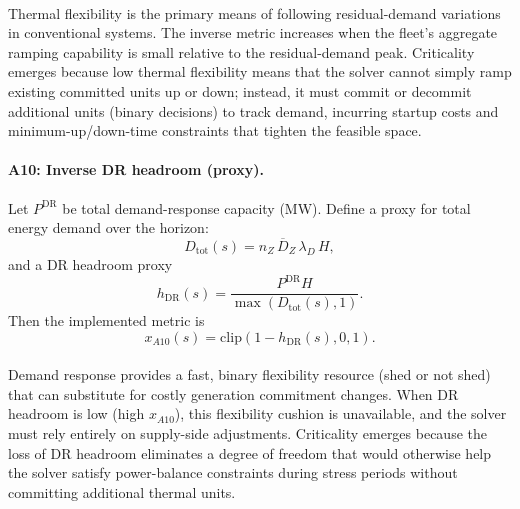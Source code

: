 \documentclass{article}
\begin{document}
\paragraph{}Thermal flexibility is the primary means of following residual-demand variations in conventional systems. The inverse metric increases when the fleet's aggregate ramping capability is small relative to the residual-demand peak. Criticality emerges because low thermal flexibility means that the solver cannot simply ramp existing committed units up or down; instead, it must commit or decommit additional units (binary decisions) to track demand, incurring startup costs and minimum-up/down-time constraints that tighten the feasible space.

\paragraph{A10: Inverse DR headroom (proxy).}
Let $P^{\mathrm{DR}}$ be total demand-response capacity (MW). Define a proxy for total energy demand over the horizon:
\begin{equation}
D_{\mathrm{tot}}(s)=n_Z\,\overline{D}_Z\,\lambda_D\,H,
\end{equation}
and a DR headroom proxy
\begin{equation}
h_{\mathrm{DR}}(s)=\frac{P^{\mathrm{DR}}H}{\max\!\left(D_{\mathrm{tot}}(s),1\right)}.
\end{equation}
Then the implemented metric is
\begin{equation}
x_{A10}(s)=\mathrm{clip}\!\left(1-h_{\mathrm{DR}}(s),0,1\right).
\end{equation}

\paragraph{}Demand response provides a fast, binary flexibility resource (shed or not shed) that can substitute for costly generation commitment changes. When DR headroom is low (high $x_{A10}$), this flexibility cushion is unavailable, and the solver must rely entirely on supply-side adjustments. Criticality emerges because the loss of DR headroom eliminates a degree of freedom that would otherwise help the solver satisfy power-balance constraints during stress periods without committing additional thermal units.
\end{document}
